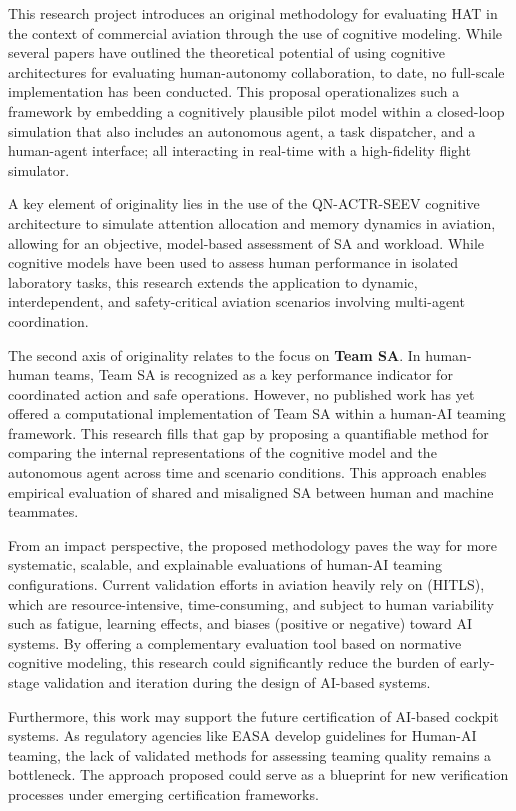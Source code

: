 \documentclass[12pt,a4paper]{article} %
\begin{document}
	This research project introduces an original methodology for evaluating HAT in the context of commercial aviation through the use of cognitive modeling. While several papers have outlined the theoretical potential of using cognitive architectures for evaluating human-autonomy collaboration, to date, no full-scale implementation has been conducted. This proposal operationalizes such a framework by embedding a cognitively plausible pilot model within a closed-loop simulation that also includes an autonomous agent, a task dispatcher, and a human-agent interface; all interacting in real-time with a high-fidelity flight simulator.
	
	A key element of originality lies in the use of the QN-ACTR-SEEV cognitive architecture to simulate attention allocation and memory dynamics in aviation, allowing for an objective, model-based assessment of SA and workload. While cognitive models have been used to assess human performance in isolated laboratory tasks, this research extends the application to dynamic, interdependent, and safety-critical aviation scenarios involving multi-agent coordination.
	
	The second axis of originality relates to the focus on \textbf{Team SA}. In human-human teams, Team SA is recognized as a key performance indicator for coordinated action and safe operations. However, no published work has yet offered a computational implementation of Team SA within a human-AI teaming framework. This research fills that gap by proposing a quantifiable method for comparing the internal representations of the cognitive model and the autonomous agent across time and scenario conditions. This approach enables empirical evaluation of shared and misaligned SA between human and machine teammates.
	
	From an impact perspective, the proposed methodology paves the way for more systematic, scalable, and explainable evaluations of human-AI teaming configurations. Current validation efforts in aviation heavily rely on (HITLS), which are resource-intensive, time-consuming, and subject to human variability such as fatigue, learning effects, and biases (positive or negative) toward AI systems. By offering a complementary evaluation tool based on normative cognitive modeling, this research could significantly reduce the burden of early-stage validation and iteration during the design of AI-based systems.
	
	Furthermore, this work may support the future certification of AI-based cockpit systems. As regulatory agencies like EASA develop guidelines for Human-AI teaming, the lack of validated methods for assessing teaming quality remains a bottleneck. The approach proposed could serve as a blueprint for new verification processes under emerging certification frameworks.
	
\end{document}
